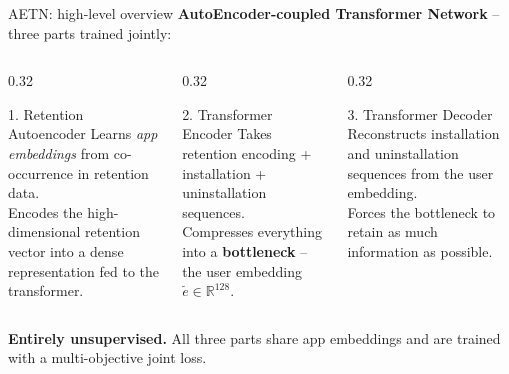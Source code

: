 \documentclass[aspectratio=169,t]{beamer}
\begin{document}
\begin{frame}{AETN: high-level overview}
  \textbf{AutoEncoder-coupled Transformer Network} -- three parts trained jointly:
  \vspace{0.3cm}
  \begin{columns}[T]
    \begin{column}{0.32\textwidth}
      \begin{block}{1. Retention Autoencoder}
        Learns \emph{app embeddings} from co-occurrence in retention data.\\[0.2cm]
        Encodes the high-dimensional retention vector into a dense representation fed to the transformer.
      \end{block}
    \end{column}
    \begin{column}{0.32\textwidth}
      \begin{block}{2. Transformer Encoder}
        Takes retention encoding + installation + uninstallation sequences.\\[0.2cm]
        Compresses everything into a \textbf{bottleneck} -- the user embedding $\tilde{e} \in \mathbb{R}^{128}$.
      \end{block}
    \end{column}
    \begin{column}{0.32\textwidth}
      \begin{block}{3. Transformer Decoder}
        Reconstructs installation and uninstallation sequences from the user embedding.\\[0.2cm]
        Forces the bottleneck to retain as much information as possible.
      \end{block}
    \end{column}
  \end{columns}
  \vspace{0.4cm}
  \begin{center}
    \textbf{Entirely unsupervised.}
    All three parts share app embeddings and are trained with a multi-objective joint loss.
  \end{center}
\end{frame}
\end{document}
